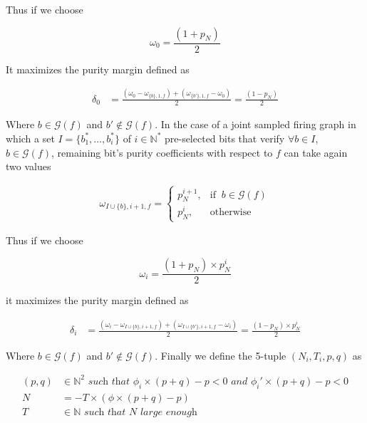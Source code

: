 \documentclass[a4paper, 11pt]{article}
\begin{document}
Thus if we choose 

\begin{equation*}
\omega_0 = \frac{(1 + p_N)}{2}
\end{equation*}

It maximizes the purity margin defined as
 
\begin{align*}
\delta_0 &=  \frac{(\omega_0 - \omega_{\{ b \}, 1, f}) + (\omega_{\{ b' \}, 1, f} - \omega_0)}{2} = \frac{(1-p_N)}{2}
\end{align*}

Where $b \in \mathcal{G}(f)$ and $b' \notin \mathcal{G}(f)$. In the case of a joint sampled firing graph in which a set $I = \{b_1^{*}, \ldots,  b_i^{*}\}$ of $i \in \mathbb{N}^{*}$ pre-selected bits that verify $\forall b \in I$, $b \in \mathcal{G}(f)$, remaining bit's purity coefficients with respect to $f$ can take again two values

\begin{align*}
\omega_{I \cup \{b\}, i+1, f} = \begin{cases} p_N^{i+1} , & \text{if }\ b \in \mathcal{G}(f) \\ p_N^{i}, & \text{otherwise} \end{cases}
\end{align*}

Thus if we choose

\begin{equation*}
\omega_i = \frac{(1 + p_N) \times p_N^{i}}{2}
\end{equation*}

it maximizes the purity margin defined as
 
\begin{align*}
\delta_i &=  \frac{(\omega_i - \omega_{I \cup \{ b \}, i+1, f}) + (\omega_{I \cup \{ b' \}, i+1, f} - \omega_i)}{2} = \frac{(1-p_N) \times p_N^{i}}{2}
\end{align*}

Where $b \in \mathcal{G}(f)$ and $b' \notin \mathcal{G}(f)$. Finally we define the 5-tuple $(N_i, T_i, p, q)$ as 

\begin{align*}
(p, q) &\in \mathbb{N}^{2} \textit{ such that } \phi_i \times (p + q) - p < 0 \textit{ and } \phi_i' \times (p + q) - p < 0 \\
N &= -T \times (\phi \times (p+q) - p)\\
T &\in \mathbb{N} \textit{ such that } N \textit{ large enough}
\end{align*}
\end{document}
